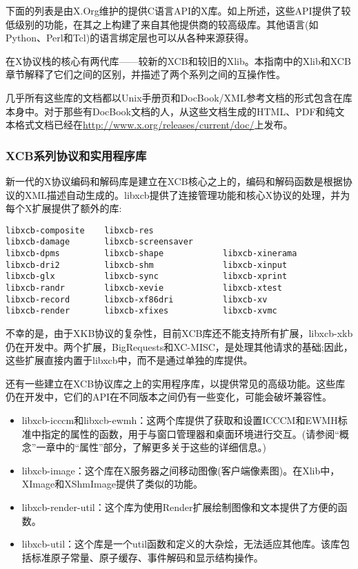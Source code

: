 下面的列表是由X.Org维护的提供C语言API的X库。如上所述，这些API提供了较低级别的功能，在其之上构建了来自其他提供商的较高级库。其他语言(如Python、Perl和Tcl)的语言绑定层也可以从各种来源获得。

在X协议栈的核心有两代库——较新的XCB和较旧的Xlib。本指南中的Xlib和XCB章节解释了它们之间的区别，并描述了两个系列之间的互操作性。

几乎所有这些库的文档都以Unix手册页和DocBook/XML参考文档的形式包含在库本身中。对于那些有DocBook文档的人，从这些文档生成的HTML、PDF和纯文本格式文档已经在\href{http://www.x.org/releases/current/doc/}{http://www.x.org/releases/current/doc/}上发布。

\subsubsection{XCB系列协议和实用程序库}

新一代的X协议编码和解码库是建立在XCB核心之上的，编码和解码函数是根据协议的XML描述自动生成的。libxcb提供了连接管理功能和核心X协议的处理，并为每个X扩展提供了额外的库:

\begin{lstlisting}
libxcb-composite    libxcb-res        
libxcb-damage       libxcb-screensaver 
libxcb-dpms         libxcb-shape            libxcb-xinerama
libxcb-dri2         libxcb-shm              libxcb-xinput
libxcb-glx          libxcb-sync         	libxcb-xprint
libxcb-randr        libxcb-xevie            libxcb-xtest
libxcb-record       libxcb-xf86dri      	libxcb-xv
libxcb-render       libxcb-xfixes       	libxcb-xvmc
\end{lstlisting}
\vspace{-3em}

不幸的是，由于XKB协议的复杂性，目前XCB库还不能支持所有扩展，libxcb-xkb仍在开发中。两个扩展，BigRequests和XC-MISC，是处理其他请求的基础;因此，这些扩展直接内置于libxcb中，而不是通过单独的库提供。

还有一些建立在XCB协议库之上的实用程序库，以提供常见的高级功能。这些库仍在开发中，它们的API在不同版本之间仍有一些变化，可能会破坏兼容性。

\vspace{-5mm}

\begin{itemize}
	\item libxcb-icccm和libxcb-ewmh：这两个库提供了获取和设置ICCCM和EWMH标准中指定的属性的函数，用于与窗口管理器和桌面环境进行交互。(请参阅“概念”一章中的“属性”部分，了解更多关于这些的详细信息。)
	\item libxcb-image：这个库在X服务器之间移动图像(客户端像素图)。在Xlib中，XImage和XShmImage提供了类似的功能。
	\item libxcb-render-util：这个库为使用Render扩展绘制图像和文本提供了方便的函数。
	\item libxcb-util：这个库是一个util函数和定义的大杂烩，无法适应其他库。该库包括标准原子常量、原子缓存、事件解码和显示结构操作。
\end{itemize}

